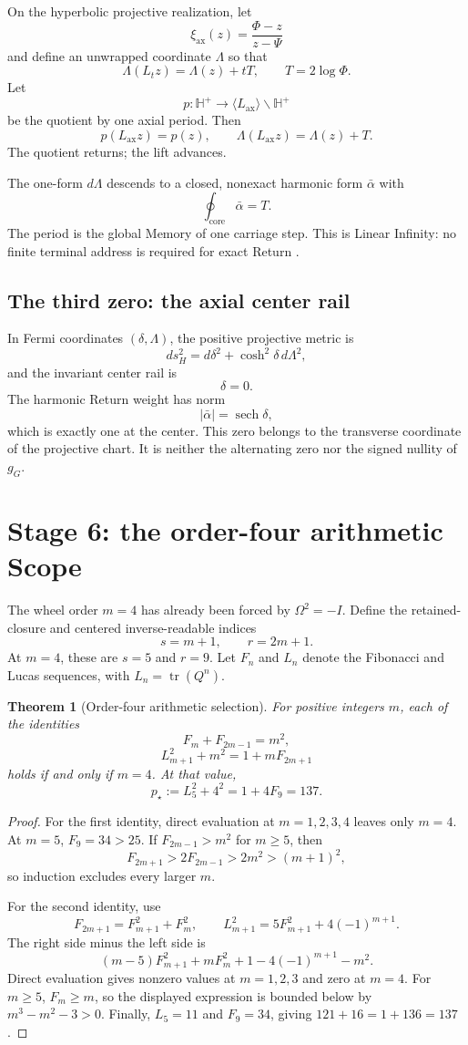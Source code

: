 \documentclass[11pt]{article}
\newtheorem{theorem}{Theorem}[section]
\newcommand{\tr}{\operatorname{tr}}
\newcommand{\sech}{\operatorname{sech}}
\begin{document}
On the hyperbolic projective realization, let
\[
\xi_{\mathrm{ax}}(z)=\frac{\Phi-z}{z-\Psi}
\]
and define an unwrapped coordinate $\Lambda$ so that
\[
\boxed{
\Lambda(L_tz)=\Lambda(z)+tT,
\qquad
T=2\log\Phi.
}
\]
Let
\[
p:\mathbb H^+\to \langle L_{\mathrm{ax}}\rangle\backslash\mathbb H^+
\]
be the quotient by one axial period. Then
\[
\boxed{p(L_{\mathrm{ax}}z)=p(z),
\qquad
\Lambda(L_{\mathrm{ax}}z)=\Lambda(z)+T.}
\]
The quotient returns; the lift advances.

The one-form $d\Lambda$ descends to a closed, nonexact harmonic form $\bar\alpha$ with
\[
\oint_{\mathrm{core}}\bar\alpha=T.
\]
The period is the global Memory of one carriage step. This is Linear Infinity: no finite terminal address is required for exact Return \cite{CoppaMirrorEscapement2026,CoppaGLMM2026}.

\subsection{The third zero: the axial center rail}

In Fermi coordinates $(\delta,\Lambda)$, the positive projective metric is
\[
ds_H^2=d\delta^2+\cosh^2\!\delta\,d\Lambda^2,
\]
and the invariant center rail is
\[
\boxed{\delta=0.}
\]
The harmonic Return weight has norm
\[
|\bar\alpha|=\sech\delta,
\]
which is exactly one at the center. This zero belongs to the transverse coordinate of the projective chart. It is neither the alternating zero nor the signed nullity of $g_G$.

\section{Stage 6: the order-four arithmetic Scope}

The wheel order $m=4$ has already been forced by $\Omega^2=-I$. Define the retained-closure and centered inverse-readable indices
\[
s=m+1,
\qquad
r=2m+1.
\]
At $m=4$, these are $s=5$ and $r=9$. Let $F_n$ and $L_n$ denote the Fibonacci and Lucas sequences, with $L_n=\tr(Q^n)$.

\begin{theorem}[Order-four arithmetic selection]
For positive integers $m$, each of the identities
\[
F_m+F_{2m-1}=m^2,
\]
\[
L_{m+1}^2+m^2=1+mF_{2m+1}
\]
holds if and only if $m=4$. At that value,
\[
\boxed{
p_\star:=L_5^2+4^2=1+4F_9=137.
}
\]
\end{theorem}
\begin{proof}
For the first identity, direct evaluation at $m=1,2,3,4$ leaves only $m=4$. At $m=5$, $F_9=34>25$. If $F_{2m-1}>m^2$ for $m\ge5$, then
\[
F_{2m+1}>2F_{2m-1}>2m^2>(m+1)^2,
\]
so induction excludes every larger $m$.

For the second identity, use
\[
F_{2m+1}=F_{m+1}^2+F_m^2,
\qquad
L_{m+1}^2=5F_{m+1}^2+4(-1)^{m+1}.
\]
The right side minus the left side is
\[
(m-5)F_{m+1}^2+mF_m^2+1-4(-1)^{m+1}-m^2.
\]
Direct evaluation gives nonzero values at $m=1,2,3$ and zero at $m=4$. For $m\ge5$, $F_m\ge m$, so the displayed expression is bounded below by $m^3-m^2-3>0$. Finally, $L_5=11$ and $F_9=34$, giving $121+16=1+136=137$.
\end{proof}
\end{document}
